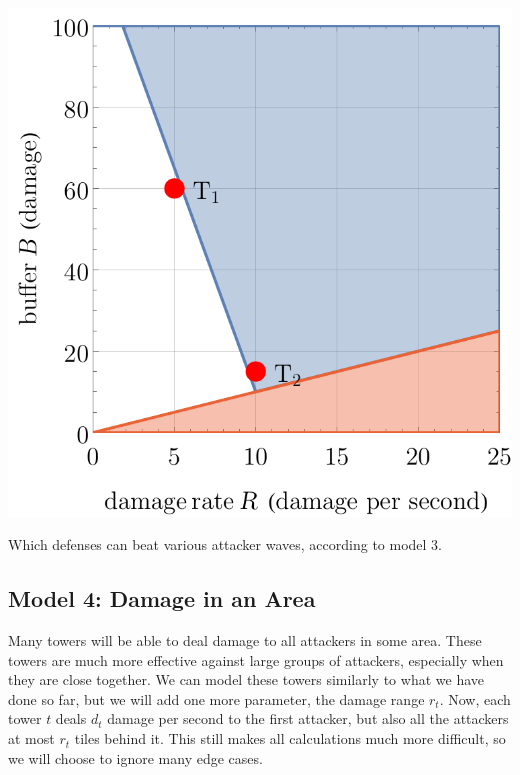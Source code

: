 \begin{center}
\begin{minipage}{.33\textwidth}
    \end{minipage}%
    \begin{minipage}{.33\textwidth}
        \centering
        \includegraphics[width=0.95\linewidth]{img/model3 n12.pdf}
    \end{minipage}%
    \caption{Which defenses can beat various attacker waves, according to model 3.}
    \label{fig:model3}
\end{center}

\subsection{Model 4: Damage in an Area}
Many towers will be able to deal damage to all attackers in some area.
These towers are much more effective against large groups of attackers, especially when they are close together.
We can model these towers similarly to what we have done so far, but we will add one more parameter, the damage range $r_t$.
Now, each tower $t$ deals $d_t$ damage per second to the first attacker, but also all the attackers at most $r_t$ tiles behind it.
This still makes all calculations much more difficult, so we will choose to ignore many edge cases.

